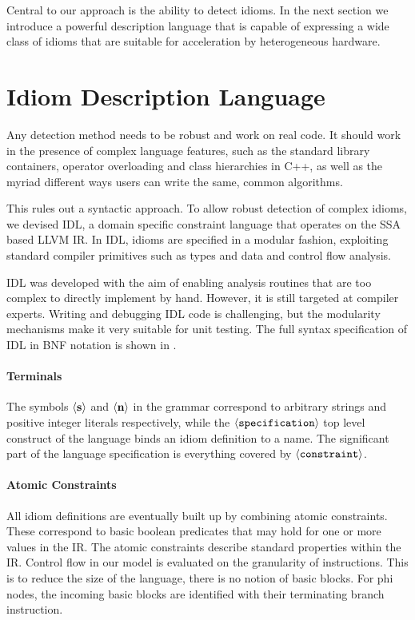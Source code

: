     Central to our approach is the ability to detect idioms.
    In the next section we introduce a powerful description language that is
    capable of expressing a wide class of idioms that are suitable for
    acceleration by heterogeneous hardware.

\section{Idiom Description Language}
\label{sec:idl}

\begin{figure}[p]
    
    \label{fig:idlbnf}
\end{figure}

    Any detection method needs to be robust and work on real code.
    It should work in the presence of complex language features, such as the
    standard library containers, operator overloading and class hierarchies in
    C++, as well as the myriad different ways users can write the same, common
    algorithms.

    This rules out a syntactic approach.
    To allow robust detection of complex idioms, we devised IDL, a domain
    specific constraint language that operates on the SSA based LLVM IR.
    In IDL, idioms are specified in a modular fashion, exploiting standard
    compiler primitives such as types and data and control flow analysis.

    IDL was developed with the aim of enabling analysis routines that are too
    complex to directly implement by hand.
    However, it is still targeted at compiler experts.
    Writing and debugging IDL code is challenging, but the modularity mechanisms
    make it very suitable for unit testing.
    The full syntax specification of IDL in BNF notation is shown in
    .

    \paragraph{Terminals}
    The symbols $\left<\text{\bf s}\right>$ and $\left<\text{\bf n}\right>$ in
    the grammar correspond to arbitrary strings and positive integer literals
    respectively, while  the $\left<\text{\tt specification}\right>$ top level
    construct of the language binds an idiom definition to a name.
    The significant  part of the language specification is everything covered by
    $\left<\text{\tt constraint}\right>$.

    \paragraph{Atomic Constraints}
    All idiom definitions are eventually built up by combining atomic
    constraints.
    These correspond to basic boolean predicates that may hold for one or more
    values in the IR.
    The atomic constraints describe standard properties within the IR.
    Control flow in our model is evaluated on the granularity of instructions.
    This is to reduce the size of the language, there is no notion of basic
    blocks.
    For phi nodes, the incoming basic blocks are identified with their
    terminating branch instruction.

